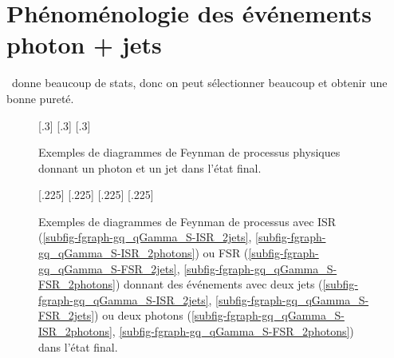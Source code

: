 \section{Phénoménologie des événements photon + jets}\label{chapter-JERC-section-pheno-GJets}
\Gjet\ donne beaucoup de stats, donc on peut sélectionner beaucoup et obtenir une bonne pureté.
\begin{figure}[h]
\centering\vspace{\baselineskip}
\subcaptionbox{\label{subfig-fgraph-gq_qGamma_S}}[.3\textwidth]
{\vspace{\baselineskip}}
\hfill
\subcaptionbox{\label{subfig-fgraph-gq_qGamma_T}}[.3\textwidth]
{\vspace{\baselineskip}}
\hfill
\subcaptionbox{\label{subfig-fgraph-qq_gGamma}}[.3\textwidth]
{\vspace{\baselineskip}}
\caption[Diagrammes de Feynman donnant un photon et un jet dans l'état final.]{Exemples de diagrammes de Feynman de processus physiques donnant un photon et un jet dans l'état final.}
\label{fig-fgraph-gamma_plus_jets}
\end{figure}

\begin{figure}[h]
\centering\vspace{\baselineskip}
\subcaptionbox{\label{subfig-fgraph-gq_qGamma_S-ISR_2jets}}[.225\textwidth]
{\vspace{\baselineskip}}
\hfill
\subcaptionbox{\label{subfig-fgraph-gq_qGamma_S-ISR_2photons}}[.225\textwidth]
{\vspace{\baselineskip}}
\hfill
\subcaptionbox{\label{subfig-fgraph-gq_qGamma_S-FSR_2jets}}[.225\textwidth]
{\vspace{\baselineskip}}
\hfill
\subcaptionbox{\label{subfig-fgraph-gq_qGamma_S-FSR_2photons}}[.225\textwidth]
{\vspace{\baselineskip}}
\caption{Exemples de diagrammes de Feynman de processus avec ISR (\ref{subfig-fgraph-gq_qGamma_S-ISR_2jets}, \ref{subfig-fgraph-gq_qGamma_S-ISR_2photons}) ou FSR (\ref{subfig-fgraph-gq_qGamma_S-FSR_2jets}, \ref{subfig-fgraph-gq_qGamma_S-FSR_2photons}) donnant des événements avec deux jets (\ref{subfig-fgraph-gq_qGamma_S-ISR_2jets}, \ref{subfig-fgraph-gq_qGamma_S-FSR_2jets}) ou deux photons (\ref{subfig-fgraph-gq_qGamma_S-ISR_2photons}, \ref{subfig-fgraph-gq_qGamma_S-FSR_2photons}) dans l'état final.}
\label{fig-fgraph-gamma_plus_jets-ISR-FSR}
\end{figure}

